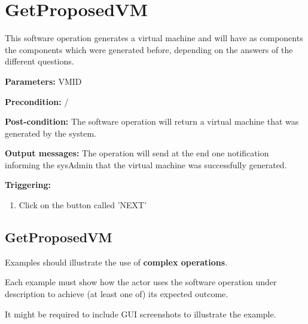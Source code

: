 \section{GetProposedVM}
\label{operation:GetProposedVM}
This software operation generates a virtual machine and will have as components
the components which were generated before, depending on the answers of the
different questions.
\begin{description}

\item \textbf{Parameters:} VMID
\item \textbf{Precondition:} /
\item \textbf{Post-condition:} The software operation will return a virtual
machine that was generated by the system.
\item \textbf{Output messages:} The operation will send at the end one
notification informing the sysAdmin that the virtual machine was successfully
generated.

\item \textbf{Triggering:}
\begin{enumerate}
\item Click on the button called 'NEXT'
\end{enumerate}

 
\end{description}

\subsection{GetProposedVM}
Examples should illustrate the use of \textbf{complex operations}.

Each example must show how the actor uses the software operation under
description to achieve (at least one of) its expected outcome.

It might be required to include GUI screenshots to illustrate the example.

























